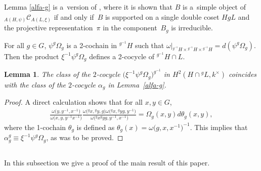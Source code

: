 \documentclass[11pt]{article}
\numberwithin{equation}{section}
\newtheorem{Lemma}[Theorem]{Lemma}
 { \theoremstyle{definition}
\newtheorem{Example}[Theorem]{Example}
\newtheorem{Remark}[Theorem]{Remark} }
\newcommand{\cch}{\Omega}
\newcommand{\C}{{\mathcal C}}
\newcommand{\1}{\textbf{1}}
\begin{document}
\begin{Remark}\label{rmk-alfag} Lemma \ref{alfa-g} is a~version of \cite[Proposition~3.2]{ostrik}, where it is shown that $B$ is a~simple object of~$_{A(H, \psi)}\C_{A(L, \xi)}$ if and only if~$B$ is supported on a single double coset $HgL$ and the projective representation~$\pi$ in the component~$B_g$ is irreducible.
\end{Remark}

For all $g \in G$, $\psi^g \cch_g$ is a 2-cochain in $^{g^{-1}\!}\!H$ such that $\omega\vert_{{}^{g^{-1}}H \times {}^{g^{-1}}H \times {}^{g^{-1}} H} = d(\psi^g \cch_g)$. Then the product $\xi^{-1} \psi^g \cch_g$ def\/ines a 2-cocycle of ${}^{g^{-1}} H \cap L$.

\begin{Lemma}\label{rel-cociclos} The class of the $2$-cocycle $\big(\xi^{-1} \psi^g \cch_g\big)^{g^{-1}}$ in $H^2(H\cap {}^gL, k^\times)$ coincides with the class of the $2$-cocycle $\alpha_g$ in Lemma~{\rm \ref{alfa-g}}.
\end{Lemma}

\begin{proof}
A direct calculation shows that for all $x, y \in G$,
\begin{gather*}\frac{\omega\big(y, y^{-1}, x^{-1}\big)}
{\omega\big(x, y, y^{-1}x^{-1}\big)}
\frac{\omega\big({}^gx, {}^gy, g\big) \omega\big({}^gx, {}^gyg, {} y^{-1}\big)}
{\omega\big({}^gx ^gyg, {}y^{-1}, x^{-1}\big)}
= \cch_g(x, y) d\theta_g (x, y),\end{gather*}
where the 1-cochain $\theta_g$ is def\/ined as $\theta_g(x) = \omega\big(g, x, x^{-1}\big)^{-1}$. This implies that $\alpha_g^g \equiv \xi^{-1} \psi^g \cch_g$, as was to be proved.
\end{proof}

\subsection{}\label{demo} In this subsection we give a proof of the main result of this paper.
\end{document}
